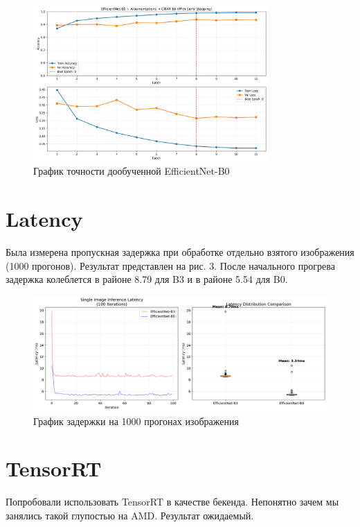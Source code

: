 \documentclass[12pt,a4paper]{article}
\begin{document}
\begin{figure}[ht]
    \centering
    \includegraphics[width=0.8\textwidth]{docs/accuracy_plot_with_early_stopping.png}
    \caption{График точности дообученной EfficientNet-B0}
    \label{fig:accuracy_plot}
\end{figure}

\section{Latency}

Была измерена пропускная задержка при обработке отдельно взятого изображения (1000 прогонов). Результат представлен на рис. 3. После начального прогрева задержка колеблется в районе 8.79 для B3 и в районе 5.54 для B0.

\begin{figure}[ht]
    \centering
    \includegraphics[width=1\textwidth]{docs/latency.png}
    \caption{График задержки на 1000 прогонах изображения}
    \label{fig:accuracy_plot}
\end{figure}

\section{TensorRT}

Попробовали использовать TensorRT в качестве бекенда. Непонятно зачем мы занялись такой глупостью на AMD. Результат ожидаемый.
\end{document}
